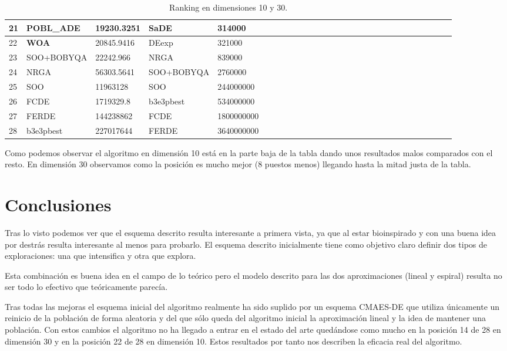 \documentclass[12pt,a4paper]{article}
\begin{document}
\begin{table}[!h]
{\begin{tabular}{ | l | l | l | l | l | l | l | l | l | l | l | l | l | l | l | l | l | l | l | l | l | l | l | l  |l | l  |l | l | }
				21 & POBL\_ADE & 19230.3251 & SaDE & 314000 \\ \hline
				22 & \textbf{WOA} & 20845.9416 & DEexp & 321000 \\ \hline
				23 & SOO+BOBYQA & 22242.966 & NRGA & 839000 \\ \hline
				24 & NRGA & 56303.5641 & SOO+BOBYQA & 2760000 \\ \hline
				25 & SOO & 11963128 & SOO & 244000000 \\ \hline
				26 & FCDE & 1719329.8 & b3e3pbest & 534000000 \\ \hline
				27 & FERDE & 144238862 & FCDE & 1800000000 \\ \hline
				28 & b3e3pbest & 227017644 & FERDE & 3640000000 \\ \hline
			\end{tabular}
		}
		\label{Ranking}
		\caption{Ranking en dimensiones 10 y 30.}
	\end{table}

	Como podemos observar el algoritmo en dimensión 10 está en la parte baja de la tabla dando unos resultados malos comparados con el resto. En dimensión 30 observamos como la posición es mucho mejor (8 puestos menos) llegando hasta la mitad justa de la tabla.
	
	\newpage
	
	\section{Conclusiones}
	
	Tras lo visto podemos ver que el esquema descrito resulta interesante a primera vista, ya que al estar bioinspirado y con una buena idea por destrás resulta interesante al menos para probarlo. El esquema descrito inicialmente tiene como objetivo claro definir dos tipos de exploraciones: una que intensifica y otra que explora.
	
	Esta combinación es buena idea en el campo de lo teórico pero el modelo descrito para las dos aproximaciones (lineal y espiral) resulta no ser todo lo efectivo que teóricamente parecía.
	
	Tras todas las mejoras el esquema inicial del algoritmo realmente ha sido suplido por un esquema CMAES-DE que utiliza únicamente un reinicio de la población de forma aleatoria y del que sólo queda del algoritmo inicial la aproximación lineal y la idea de mantener una población. Con estos cambios el algoritmo no ha llegado a entrar en el estado del arte quedándose como mucho en la posición 14 de 28 en dimensión 30 y en la posición 22 de 28 en dimensión 10. Estos resultados por tanto nos describen la eficacia real del algoritmo.
	
\end{document}
